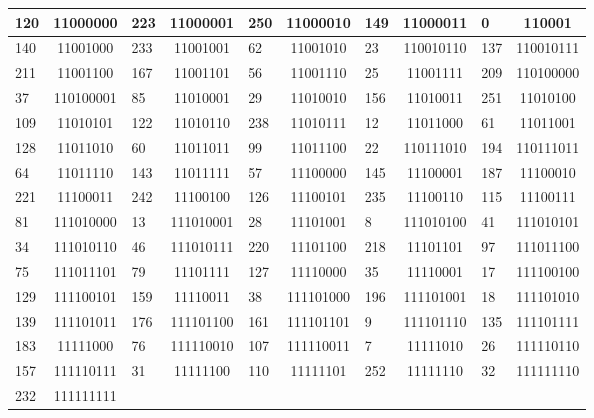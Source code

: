 \documentclass[conference,onecolumn,12pt]{IEEEtran}
\numberwithin{equation}{subsection}
\begin{document}
\begin{table}[h]
\begin{tabular}{l c l c l c l c l c}
120 & 11000000 & 223 & 11000001 & 250 & 11000010 & 149 & 11000011 & 0 & 110001 \\ \hline
140 & 11001000 & 233 & 11001001 & 62 & 11001010 & 23 & 110010110 & 137 & 110010111 \\ \hline
211 & 11001100 & 167 & 11001101 & 56 & 11001110 & 25 & 11001111 & 209 & 110100000 \\ \hline
37 & 110100001 & 85 & 11010001 & 29 & 11010010 & 156 & 11010011 & 251 & 11010100 \\ \hline
109 & 11010101 & 122 & 11010110 & 238 & 11010111 & 12 & 11011000 & 61 & 11011001 \\ \hline
128 & 11011010 & 60 & 11011011 & 99 & 11011100 & 22 & 110111010 & 194 & 110111011 \\ \hline
64 & 11011110 & 143 & 11011111 & 57 & 11100000 & 145 & 11100001 & 187 & 11100010 \\ \hline
221 & 11100011 & 242 & 11100100 & 126 & 11100101 & 235 & 11100110 & 115 & 11100111 \\ \hline
81 & 111010000 & 13 & 111010001 & 28 & 11101001 & 8 & 111010100 & 41 & 111010101 \\ \hline
34 & 111010110 & 46 & 111010111 & 220 & 11101100 & 218 & 11101101 & 97 & 111011100 \\ \hline
75 & 111011101 & 79 & 11101111 & 127 & 11110000 & 35 & 11110001 & 17 & 111100100 \\ \hline
129 & 111100101 & 159 & 11110011 & 38 & 111101000 & 196 & 111101001 & 18 & 111101010 \\ \hline
139 & 111101011 & 176 & 111101100 & 161 & 111101101 & 9 & 111101110 & 135 & 111101111 \\ \hline
183 & 11111000 & 76 & 111110010 & 107 & 111110011 & 7 & 11111010 & 26 & 111110110 \\ \hline
157 & 111110111 & 31 & 11111100 & 110 & 11111101 & 252 & 11111110 & 32 & 111111110 \\ \hline
232 & 111111111 &  &  &  &  &  &  &  &  \\ \hline
\end{tabular}
\end{table}
\end{document}
